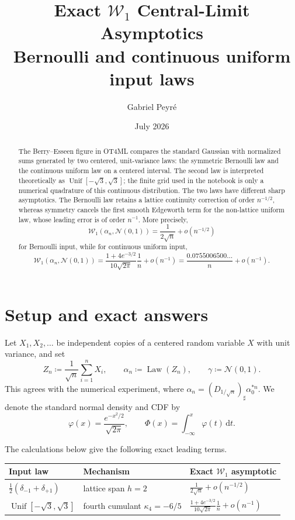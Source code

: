 \documentclass[11pt]{article}
\title{Exact $\mathcal W_1$ Central-Limit Asymptotics\\
  \large Bernoulli and continuous uniform input laws}
\author{Gabriel Peyr\'e}
\date{July 2026}
\theoremstyle{remark}
\newcommand{\Wass}{\mathcal{W}}
\newcommand{\dd}{\,\mathrm{d}}
\newcommand{\Law}{\operatorname{Law}}
\newcommand{\Unif}{\operatorname{Unif}}
\begin{document}
\maketitle

\begin{abstract}
The Berry--Esseen figure in OT4ML compares the standard Gaussian with
normalized sums generated by two centered, unit-variance laws: the symmetric
Bernoulli law and the continuous uniform law on a centered interval. The
second law is interpreted theoretically as $\Unif[-\sqrt3,\sqrt3]$; the finite
grid used in the notebook is only a numerical quadrature of this continuous
distribution. The two laws have different sharp asymptotics. The Bernoulli
law retains a lattice continuity correction of order $n^{-1/2}$, whereas
symmetry cancels the first smooth Edgeworth term for the non-lattice uniform
law, whose leading error is of order $n^{-1}$. More precisely,
\[
  \Wass_1(\alpha_n,\mathcal N(0,1))
  =\frac{1}{2\sqrt n}+o(n^{-1/2})
\]
for Bernoulli input, while for continuous uniform input,
\[
  \Wass_1(\alpha_n,\mathcal N(0,1))
  =\frac{1+4e^{-3/2}}{10\sqrt{2\pi}}\frac1n+o(n^{-1})
  =\frac{0.0755006500\ldots}{n}+o(n^{-1}).
\]
\end{abstract}

\section{Setup and exact answers}

Let $X_1,X_2,\ldots$ be independent copies of a centered random variable
$X$ with unit variance, and set
\begin{equation}\label{eq:normalized-sum}
  Z_n\coloneqq \frac{1}{\sqrt n}\sum_{i=1}^n X_i,
  \qquad
  \alpha_n\coloneqq\Law(Z_n),
  \qquad
  \gamma\coloneqq\mathcal N(0,1).
\end{equation}
This agrees with the numerical experiment, where
$\alpha_n=(D_{1/\sqrt n})_\sharp\alpha_0^{*n}$. We denote the standard normal
density and CDF by
\begin{equation}\label{eq:normal-density-cdf}
  \varphi(x)=\frac{e^{-x^2/2}}{\sqrt{2\pi}},
  \qquad
  \Phi(x)=\int_{-\infty}^x\varphi(t)\dd t.
\end{equation}

The calculations below give the following exact leading terms.
\begin{center}
\begin{tabular}{@{}lll@{}}
\toprule
Input law & Mechanism & Exact $\mathcal W_1$ asymptotic \\
\midrule
$\frac12(\delta_{-1}+\delta_{+1})$
  & lattice span $h=2$
  & $\frac{1}{2\sqrt n}+o(n^{-1/2})$ \\[1mm]
$\Unif[-\sqrt3,\sqrt3]$
  & fourth cumulant $\kappa_4=-6/5$
  & $\frac{1+4e^{-3/2}}{10\sqrt{2\pi}}\frac1n+o(n^{-1})$ \\
\bottomrule
\end{tabular}
\end{center}
\end{document}
